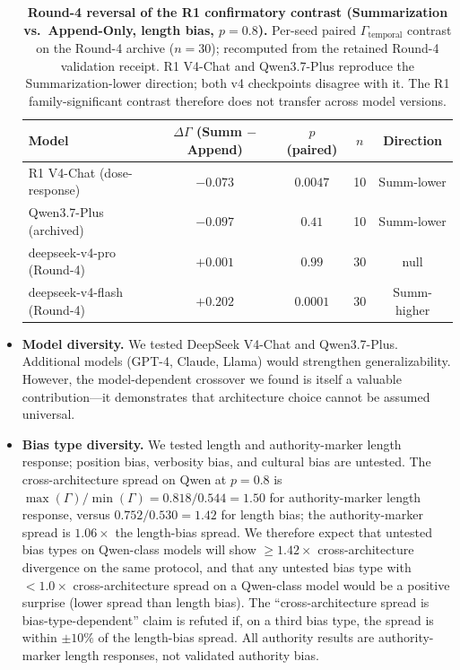 \documentclass[11pt]{article}
\begin{document}
\begin{itemize}[nosep]
\begin{table}[htbp]
\centering
\caption{\textbf{Round-4 reversal of the R1 confirmatory contrast (Summarization vs.\ Append-Only, length bias, $p{=}0.8$).} Per-seed paired $\Gamma_{\text{temporal}}$ contrast on the Round-4 archive ($n{=}30$); recomputed from the retained Round-4 validation receipt. R1 V4-Chat and Qwen3.7-Plus reproduce the Summarization-lower direction; both v4 checkpoints disagree with it. The R1 family-significant contrast therefore does not transfer across model versions.}
\label{tab:round4-reversal}
\begin{tabular}{@{}lcccc@{}}
\toprule
Model & $\Delta\Gamma$ (Summ $-$ Append) & $p$ (paired) & $n$ & Direction \\
\midrule
R1 V4-Chat (dose-response) & $-0.073$ & $0.0047$ & 10 & Summ-lower \\
Qwen3.7-Plus (archived) & $-0.097$ & $0.41$ & 10 & Summ-lower \\
deepseek-v4-pro (Round-4) & $+0.001$ & $0.99$ & 30 & null \\
deepseek-v4-flash (Round-4) & $+0.202$ & $0.0001$ & 30 & Summ-higher \\
\bottomrule
\end{tabular}
\end{table}
    \item \textbf{Model diversity.} We tested DeepSeek V4-Chat and Qwen3.7-Plus. Additional models (GPT-4, Claude, Llama) would strengthen generalizability. However, the model-dependent crossover we found is itself a valuable contribution---it demonstrates that architecture choice cannot be assumed universal.
    \item \textbf{Bias type diversity.} We tested length and authority-marker length response; position bias, verbosity bias, and cultural bias are untested. The cross-architecture spread on Qwen at $p=0.8$ is $\max(\Gamma)/\min(\Gamma) = 0.818/0.544 = 1.50$ for authority-marker length response, versus $0.752/0.530 = 1.42$ for length bias; the authority-marker spread is $1.06\times$ the length-bias spread. We therefore expect that untested bias types on Qwen-class models will show $\geq 1.42\times$ cross-architecture divergence on the same protocol, and that any untested bias type with $< 1.0\times$ cross-architecture spread on a Qwen-class model would be a positive surprise (lower spread than length bias). The ``cross-architecture spread is bias-type-dependent'' claim is refuted if, on a third bias type, the spread is within $\pm 10\%$ of the length-bias spread. All authority results are authority-marker length responses, not validated authority bias.

\end{itemize}
\end{document}
